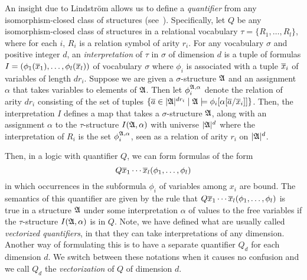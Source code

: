 \documentclass[a4paper,UKenglish,cleveref, autoref, thm-restate, anonymous]{lipics-v2021}
\begin{document}
An insight due to Lindstr\"om allows us to define a \emph{quantifier} from any isomorphism-closed class of structures (see~\cite{Ebb85}).  Specifically, let $Q$ be any isomorphism-closed class of structures in a relational vocabulary $\tau = \{ R_1,\ldots,R_l\}$, where for each $i$, $R_i$ is a relation symbol of arity $r_i$.  For any vocabulary $\sigma$ and positive integer $d$, an \emph{interpretation} of $\tau$ in $\sigma$ of dimension $d$ is a tuple of formulas $I = (\phi_1(\overline{x}_1),\dots, \phi_l(\overline{x}_l))$ of vocabulary $\sigma$ where $\phi_i$ is associated with a tuple $\overline{x}_i$ of variables of length $dr_i$.  Suppose we are given a $\sigma$-structure $\mathfrak{A}$ and an assignment $\alpha$ that takes variables to elements of $\mathfrak{A}$.  Then let $\phi_i^{\mathfrak{A},\alpha}$ denote the relation of arity $dr_i$ consisting of the set of tuples $\{\overline{a} \in |\mathfrak{A}|^{dr_i} \mid \mathfrak{A} \models \phi_i[\alpha[\overline{a}/\overline{x}_i]] \}$.  Then, the interpretation $I$ defines a map that takes a $\sigma$-structure $\mathfrak{A}$, along with an assignment $\alpha$ to the  $\tau$-structure $I(\mathfrak{A},\alpha)$ with universe $|\mathfrak{A}|^d$ where the interpretation of $R_i$ is the set $\phi_i^{\mathfrak{A},\alpha}$, seen as a relation of arity $r_i$ on $|\mathfrak{A}|^d$.

Then, in a logic with quantifier $Q$, we can form formulas of the form
$$Q \overline{x}_1\cdots \overline{x}_l (\phi_1,\ldots,\phi_l)$$
in which occurrences in the subformula $\phi_i$  of variables among $x_i$ are bound.  The semantics of this quantifier are given by the rule that 
$Q \overline{x}_1\cdots \overline{x}_l (\phi_1,\ldots,\phi_l)$ is true in a structure $\mathfrak{A}$ under some interpretation $\alpha$ of values to the free variables if the $\tau$-structure $I(\mathfrak{A},\alpha)$ is in $Q$.  Note, we have defined what are usually called \emph{vectorized quantifiers}, in that they can take interpretations of any dimension.  Another way of formulating this is to have a separate quantifier $Q_d$ for each dimension $d$.  We switch between these notations when it causes no confusion and we call $Q_d$ the \emph{vectorization} of $Q$ of dimension $d$.
\end{document}
